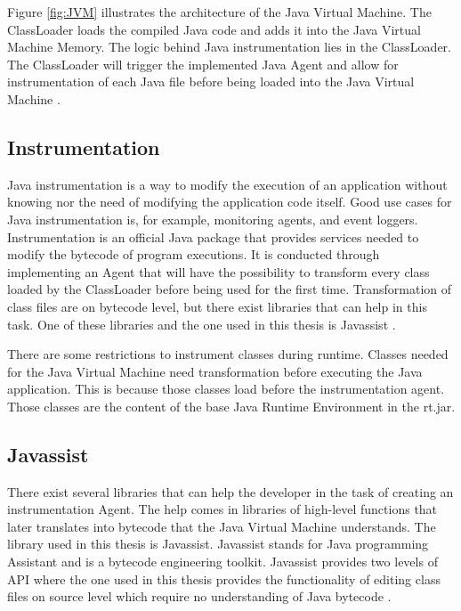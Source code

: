 Figure \ref{fig:JVM} illustrates the architecture of the Java Virtual Machine. The ClassLoader loads the compiled Java code and adds it into the Java Virtual Machine Memory. The logic behind Java instrumentation lies in the ClassLoader. The ClassLoader will trigger the implemented Java Agent and allow for instrumentation of each Java file before being loaded into the Java Virtual Machine \parencite{venners_1999, instru}.



\subsection{Instrumentation}
Java instrumentation is a way to modify the execution of an application without knowing nor the need of modifying the application code itself. Good use cases for Java instrumentation is, for example, monitoring agents, and event loggers. Instrumentation is an official Java package that provides services needed to modify the bytecode of program executions. It is conducted through implementing an Agent that will have the possibility to transform every class loaded by the ClassLoader before being used for the first time. Transformation of class files are on bytecode level, but there exist libraries that can help in this task. One of these libraries and the one used in this thesis is Javassist \parencite{Java_Instrument, Javassist}.

There are some restrictions to instrument classes during runtime. Classes needed for the Java Virtual Machine need transformation before executing the Java application. This is because those classes load before the instrumentation agent. Those classes are the content of the base Java Runtime Environment in the rt.jar.



\subsection{Javassist}
There exist several libraries that can help the developer in the task of creating an instrumentation Agent. The help comes in libraries of high-level functions that later translates into bytecode that the Java Virtual Machine understands. The library used in this thesis is Javassist. Javassist stands for Java programming Assistant and is a bytecode engineering toolkit. Javassist provides two levels of API where the one used in this thesis provides the functionality of editing class files on source level which require no understanding of Java bytecode \parencite{Javassist}.